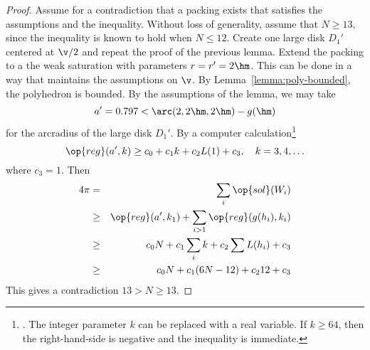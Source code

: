 \begin{proof} Assume for a contradiction that a packing exists that
satisfies the assumptions and the inequality.  Without loss of
generality, assume that $N\ge 13$, since the inequality is known to
hold when $N\le 12$.  Create one large disk $D_1'$ centered at $
\v/2$ and repeat the proof of the previous lemma.  Extend the packing to a the weak
saturation with parameters $r=r'=2\hm$.  This can be done in a way that maintains
the assumptions on $\v$.  By
Lemma~\ref{lemma:poly-bounded}, the polyhedron is
bounded.  By the assumptions of the lemma, we may take
\begin{displaymath}a'=0.797 < \arc(2,2\hm,2\hm)-g(\hm)\end{displaymath} 
for the arcradius of the large disk $D_1'$.  
By a computer calculation\footnote{.
The integer parameter $k$ can be replaced with a real variable.  If $k\ge64$, then
the right-hand-side is negative and the inequality is immediate.} %
\begin{equation}\label{eqn:alin2} 
\op{reg}(a',k) \ge c_0 + c_1 k + c_2 L(1) +
c_3,\quad k=3,4,\ldots\end{equation}
where
$c_3 =  1$.  %
Then 
\begin{eqnarray*} \label{eqn:D'}
4\pi &=& \sum_i\op{sol}(W_i)\\
&\ge& \op{reg}(a',k_1)+\sum_{i>1} \op{reg}(g(h_i),k_i) \\
&\ge&  c_0 N +c_1\sum_i k + c_2 \sum L(h_i) + c_3\\
&\ge& c_0 N +c_1 (6N-12) + c_2 12 + c_3\\
\end{eqnarray*}
This gives a contradiction
$13 > N \ge 13.$
\end{proof}
